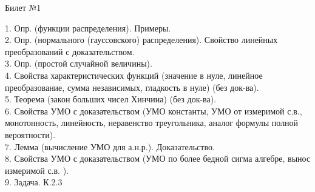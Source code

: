 \documentclass[preview]{standalone}
\begin{document}
 
\begin{center} {\Large Билет №1} \end{center} 

1.  Опр. (функции распределения). Примеры.\\

2.  Опр. (нормального (гауссовского) распределения). Свойство линейных преобразований с доказательством.\\

3.  Опр. (простой случайной величины).\\

4.  Свойства характеристических функций (значение в нуле, линейное преобразование, сумма независимых, гладкость в нуле) (без док-ва).\\

5.  Теорема (закон больших чисел Хинчина) (без док-ва).\\

6.  Свойства УМО с доказательством (УМО константы, УМО от измеримой с.в., монотонность,  линейность, неравенство треугольника,  аналог формулы полной вероятности).\\

7.  Лемма (вычисление УМО для а.н.р.). Доказательство.\\

8.  Свойства УМО с доказательством (УМО по более бедной сигма алгебре, вынос измеримой с.в. ).\\

9. Задача. К.2.3\\
\end{document}
